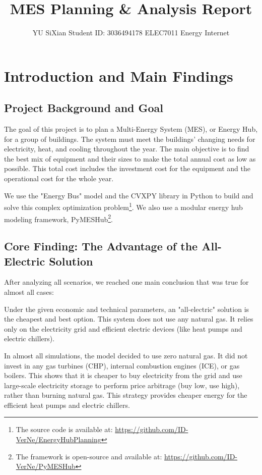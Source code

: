 \documentclass[12pt, a4paper]{article}
\title{MES Planning \& Analysis Report}
\author{YU SiXian  Student ID: 3036494178  ELEC7011 Energy Internet}
\date{} %
\begin{document}
\maketitle

\section{Introduction and Main Findings}
\subsection{Project Background and Goal}

The goal of this project is to plan a Multi-Energy System (MES), or Energy Hub, for a group of buildings. The system must meet the buildings' changing needs for electricity, heat, and cooling throughout the year. The main objective is to find the best mix of equipment and their sizes to make the total annual cost as low as possible. This total cost includes the investment cost for the equipment and the operational cost for the whole year.

We use the "Energy Bus" model and the CVXPY library in Python to build and solve this complex optimization problem\footnote{The source code is available at: \url{https://github.com/ID-VerNe/EnergyHubPlanning}}. We also use a modular energy hub modeling framework, PyMESHub\footnote{The framework is open-source and available at: \url{https://github.com/ID-VerNe/PyMESHub}}.

\subsection{Core Finding: The Advantage of the All-Electric Solution}
After analyzing all scenarios, we reached one main conclusion that was true for almost all cases:

Under the given economic and technical parameters, an "all-electric" solution is the cheapest and best option. This system does not use any natural gas. It relies only on the electricity grid and efficient electric devices (like heat pumps and electric chillers).

In almost all simulations, the model decided to use zero natural gas. It did not invest in any gas turbines (CHP), internal combustion engines (ICE), or gas boilers. This shows that it is cheaper to buy electricity from the grid and use large-scale electricity storage to perform price arbitrage (buy low, use high), rather than burning natural gas. This strategy provides cheaper energy for the efficient heat pumps and electric chillers.
\end{document}

